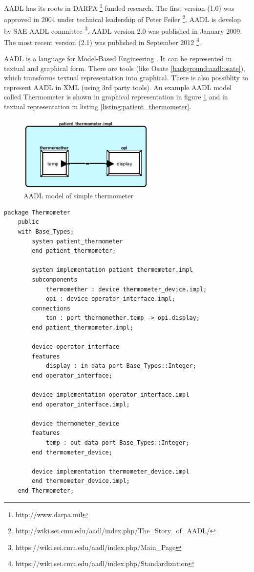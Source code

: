 AADL has its roots in DARPA \footnote{http://www.darpa.mil} funded research. The first version (1.0) was approved in 2004 under technical leadership of Peter Feiler \footnote{http://wiki.sei.cmu.edu/aadl/index.php/The\_Story\_of\_AADL/}. AADL is develop by SAE AADL committee \footnote{https://wiki.sei.cmu.edu/aadl/index.php/Main\_Page}. AADL version 2.0 was published in January 2009. The most recent version (2.1) was published in September 2012 \footnote{https://wiki.sei.cmu.edu/aadl/index.php/Standardization}.

AADL is a language for Model-Based Engineering \cite{AadlBook}. It can be represented in textual and graphical form. There are tools (like Osate \ref{background:aadl:osate}), which transforms textual representation into graphical. There is also possiblity to represent AADL in XML (using 3rd party tools). An example AADL model called Thermometer is shown in graphical representation in figure \ref{figure:patient_thermometer} and in textual representation in listing \ref{listing:patient_thermometer}.

\begin{figure}[ht]%
    \begin{center}
    	\includegraphics[height=1.5in]{figures/patient_thermometer.png}
    	\caption{AADL model of simple thermometer}
    \end{center}
    \label{figure:patient_thermometer}
\end{figure}

\singlespacing
\begin{lstlisting}[language=aadl, frame=single, gobble=0, caption={AADL model of simple thermometer}, label={listing:patient_thermometer}]
	package Thermometer
	public
	with Base_Types;
		system patient_thermometer
		end patient_thermometer;

		system implementation patient_thermometer.impl
		subcomponents
			thermomether : device thermometer_device.impl;
			opi : device operator_interface.impl;
		connections
			tdn : port thermomether.temp -> opi.display;
		end patient_thermometer.impl;

		device operator_interface
		features
			display : in data port Base_Types::Integer;
		end operator_interface;

		device implementation operator_interface.impl
		end operator_interface.impl;

		device thermometer_device
		features
			temp : out data port Base_Types::Integer;
		end thermometer_device;

		device implementation thermometer_device.impl
		end thermometer_device.impl;
	end Thermometer;
\end{lstlisting} 
\doublespacing

